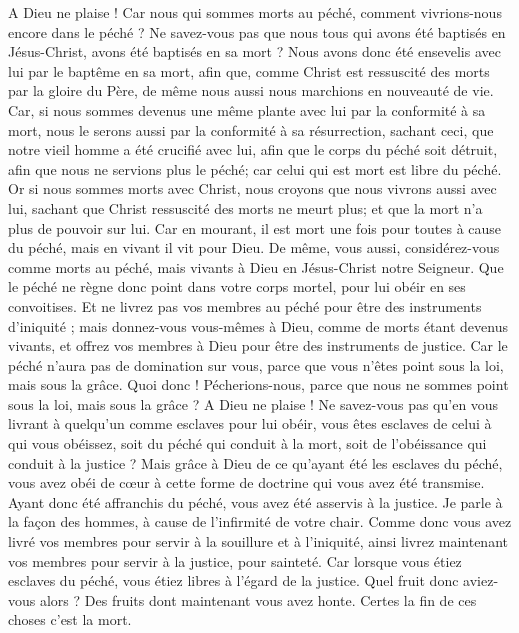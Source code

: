 \begin{multicols}{2}
A Dieu ne plaise ! Car nous qui sommes morts au péché, comment vivrions-nous encore dans le péché ?
Ne savez-vous pas que nous tous qui avons été baptisés en Jésus-Christ, avons été baptisés en sa mort ?
Nous avons donc été ensevelis avec lui par le baptême en sa mort, afin que, comme Christ est ressuscité des morts par la gloire du Père, de même nous aussi nous marchions en nouveauté de vie.
Car, si nous sommes devenus une même plante avec lui par la conformité à sa mort, nous le serons aussi par la conformité à sa résurrection,
sachant ceci, que notre vieil homme a été crucifié avec lui, afin que le corps du péché soit détruit, afin que nous ne servions plus le péché;
car celui qui est mort est libre du péché.
Or si nous sommes morts avec Christ, nous croyons que nous vivrons aussi avec lui,
sachant que Christ ressuscité des morts ne meurt plus; et que la mort n'a plus de pouvoir sur lui.
Car en mourant, il est mort une fois pour toutes à cause du péché, mais en vivant il vit pour Dieu.
De même, vous aussi, considérez-vous comme morts au péché, mais vivants à Dieu en Jésus-Christ notre Seigneur.
Que le péché ne règne donc point dans votre corps mortel, pour lui obéir en ses convoitises.
Et ne livrez pas vos membres au péché pour être des instruments d'iniquité ; mais donnez-vous vous-mêmes à Dieu, comme de morts étant devenus vivants, et offrez vos membres à Dieu pour être des instruments de justice.
Car le péché n'aura pas de domination sur vous, parce que vous n'êtes point sous la loi, mais sous la grâce.
Quoi donc ! Pécherions-nous, parce que nous ne sommes point sous la loi, mais sous la grâce ? A Dieu ne plaise !
Ne savez-vous pas qu'en vous livrant à quelqu'un comme esclaves pour lui obéir, vous êtes esclaves de celui à qui vous obéissez, soit du péché qui conduit à la mort, soit de l'obéissance qui conduit à la justice ?
Mais grâce à Dieu de ce qu'ayant été les esclaves du péché, vous avez obéi de cœur à cette forme de doctrine qui vous avez été transmise.
Ayant donc été affranchis du péché, vous avez été asservis à la justice.
Je parle à la façon des hommes, à cause de l'infirmité de votre chair. Comme donc vous avez livré vos membres pour servir à la souillure et à l'iniquité, ainsi livrez maintenant vos membres pour servir à la justice, pour sainteté.
Car lorsque vous étiez esclaves du péché, vous étiez libres à l'égard de la justice.
Quel fruit donc aviez-vous alors ? Des fruits dont maintenant vous avez honte. Certes la fin de ces choses c'est la mort.

\end{multicols}
